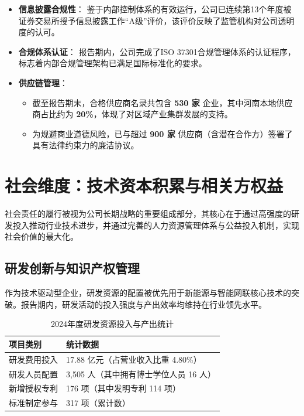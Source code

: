 \documentclass[a4paper,12pt]{article}
\begin{document}
\begin{itemize}
    \item \textbf{信息披露合规性}：
    鉴于内部控制体系的有效运行，公司已连续第13个年度被证券交易所授予信息披露工作“A级”评价，该评价反映了监管机构对公司透明度的认可。
    \item \textbf{合规体系认证}：
    报告期内，公司完成了ISO 37301合规管理体系的认证程序，标志着内部合规管理架构已满足国际标准化的要求。
    \item \textbf{供应链管理}：
    \begin{itemize}
        \item 截至报告期末，合格供应商名录共包含 \textbf{530 家} 企业，其中河南本地供应商占比约为 \textbf{20\%}，体现了对区域产业集群发展的支持。
        \item 为规避商业道德风险，已与超过 \textbf{900 家} 供应商（含潜在合作方）签署了具有法律约束力的廉洁协议。
    \end{itemize}
\end{itemize}

\section{社会维度：技术资本积累与相关方权益}

社会责任的履行被视为公司长期战略的重要组成部分，其核心在于通过高强度的研发投入推动行业技术进步，并通过完善的人力资源管理体系与公益投入机制，实现社会价值的最大化。

\subsection{研发创新与知识产权管理}

作为技术驱动型企业，研发资源的配置被优先用于新能源与智能网联核心技术的突破。报告期内，研发活动的投入强度与产出效率均维持在行业领先水平。

\begin{table}[h]
\centering
\caption{2024年度研发资源投入与产出统计}
\renewcommand{\arraystretch}{1.3}
\begin{tabular}{l l}
\toprule
\textbf{项目类别} & \textbf{统计数据} \\
\midrule
研发费用投入 & 17.88 亿元（占营业收入比重 4.80\%） \\
研发人员配置 & 3,505 人（其中拥有博士学位人员 16 人） \\
新增授权专利 & 176 项（其中发明专利 114 项） \\
标准制定参与 & 317 项（累计数） \\
\bottomrule
\end{tabular}
\end{table}
\end{document}
